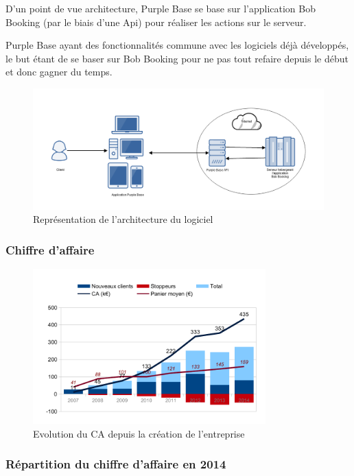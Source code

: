 D'un point de vue architecture, Purple Base se base sur l'application Bob Booking (par le biais d'une Api) pour réaliser les actions sur le serveur. 

Purple Base ayant des fonctionnalités commune avec les logiciels déjà développés, le but étant de se baser sur Bob Booking pour ne pas tout refaire depuis le début et donc gagner du temps. 

\begin{figure}[h!]
\centering
\includegraphics[width=1\textwidth]{assets/archi_pb.png}
\caption{Représentation de l'architecture du logiciel}
\label{fig:my_label}
\end{figure}


\subsubsection{Chiffre d'affaire}

\begin{figure}[h!]
\centering
\includegraphics[width=0.8\textwidth]{assets/evol_ca_bob.pdf}
\caption{Evolution du CA depuis la création de l'entreprise}
\label{fig:my_label}
\end{figure}

\subsubsection{Répartition du chiffre d'affaire en 2014}

